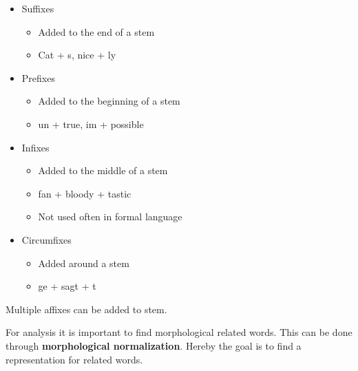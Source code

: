 \documentclass[
../../NLP4W_Summary.tex,
]
{subfiles}
\begin{document}
\begin{greenbox}
    \begin{itemize}
        \item Suffixes
        \begin{itemize}
            \item Added to the end of a stem
            \item Cat + s, nice + ly
        \end{itemize}
        \item Prefixes 
        \begin{itemize}
            \item Added to the beginning of a stem
            \item un + true, im + possible
        \end{itemize}
        \item Infixes
        \begin{itemize}
            \item Added to the middle of a stem
            \item fan + bloody + tastic
            \item Not used often in formal language
        \end{itemize}
        \item Circumfixes
        \begin{itemize}
            \item Added around a stem
            \item ge + sagt + t
        \end{itemize}
    \end{itemize}
\end{greenbox}

Multiple affixes can be added to stem.

For analysis it is important to find morphological related words. This can be done through \textbf{morphological normalization}. Hereby the goal is to find a representation for related words.
\end{document}
